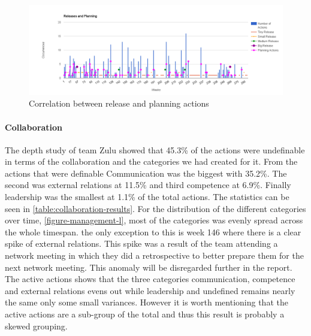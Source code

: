 \begin{figure}
	\centering
	\includegraphics[width=\textwidth, keepaspectratio]{figures/releases-and-planning.png}
	\caption{Correlation between release and planning actions}
	\label{figure:releases-and-planning}
\end{figure}

\paragraph{Collaboration}
The depth study of team Zulu showed that 45.3\% of the actions were undefinable in terms of the collaboration and the categories we had created for it. From the actions that were definable Communication was the biggest with 35.2\%. The second was external relations at 11.5\% and third competence at 6.9\%. Finally leadership was the smallest at 1.1\% of the total actions. The statistics can be seen in \autoref{table:collaboration-results}. For the distribution of the different categories over time, \autoref{figure-management-l}, most of the categories was evenly spread across the whole timespan. the only exception to this is week 146 where there is a clear spike of external relations. This spike was a result of the team attending a network meeting in which they did a retrospective to better prepare them for the next network meeting. This anomaly will be disregarded further in the report. 
The active actions shows that the three categories communication, competence and external relations evens out while leadership and undefined remains nearly the same only some small variances. However it is worth mentioning that the active actions are a sub-group of the total and thus this result is probably a skewed grouping. 

